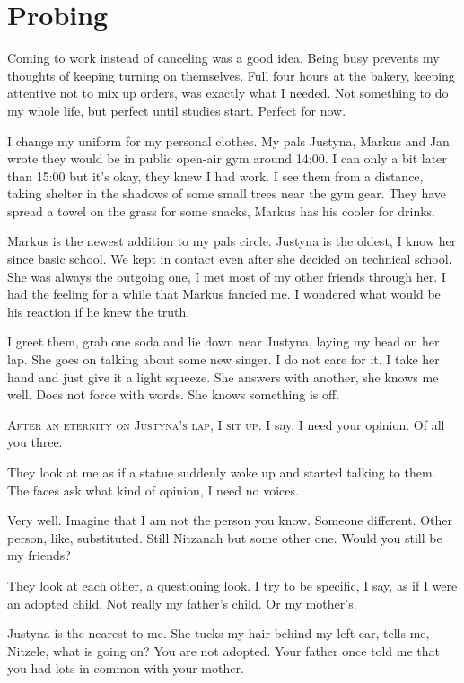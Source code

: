 \chapter*{Probing}\label{probing}

Coming to work instead of canceling was a good idea. Being busy prevents my thoughts of keeping turning on themselves. Full four hours at the bakery, keeping attentive not to mix up orders, was exactly what I needed. Not something to do my whole life, but perfect until studies start. Perfect for now. 

I change my uniform for my personal clothes. My pals Justyna, Markus and Jan wrote they would be in public open-air gym around 14:00. I can only a bit later than 15:00 but it's okay, they knew I had work. I see them from a distance, taking shelter in the shadows of some small trees near the gym gear. They have spread a towel on the grass for some snacks, Markus has his cooler for drinks.

Markus is the newest addition to my pals circle. Justyna is the oldest, I know her since basic school. We kept in contact even after she decided on technical school. She was always the outgoing one, I met most of my other friends through her. I had the feeling for a while that Markus fancied me. I wondered what would be his reaction if he knew the truth. 

I greet them, grab one soda and lie down near Justyna, laying my head on her lap. She goes on talking about some new singer. I do not care for it. I take her hand and just give it a light squeeze. She answers with another, she knows me well. Does not force with words. She knows something is off. 

\bigskip\noindent\textsc{After an eternity on Justyna's lap, I sit up.} I say, I need your opinion. Of all you three. 

They look at me as if a statue suddenly woke up and started talking to them. The faces ask what kind of opinion, I need no voices.

Very well. Imagine that I am not the person you know. Someone different. Other person, like, substituted. Still Nitzanah but some other one. Would you still be my friends?

They look at each other, a questioning look. I try to be specific, I say, as if I were an adopted child. Not really my father's child. Or my mother's.

Justyna is the nearest to me. She tucks my hair behind my left ear, tells me, Nitzele, what is going on? You are not adopted. Your father once told me that you had lots in common with your mother.

